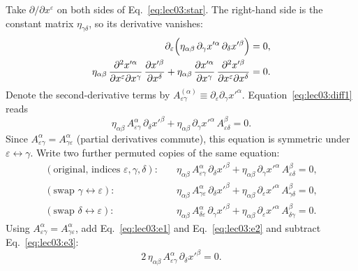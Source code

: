 Take $\partial/\partial x^\varepsilon$ on both sides of
Eq.~\eqref{eq:lec03:star}.  The right-hand side is the constant matrix
$\eta_{\gamma\delta}$, so its derivative vanishes:
\begin{align}
  \partial_\varepsilon \Bigl(
    \eta_{\alpha\beta}\,\partial_\gamma x'^\alpha\,\partial_\delta x'^\beta
  \Bigr) &= 0, \notag\\
  \eta_{\alpha\beta}\,
    \frac{\partial^2 x'^\alpha}{\partial x^\varepsilon \partial x^\gamma}\,
    \frac{\partial x'^\beta}{\partial x^\delta}
  +
  \eta_{\alpha\beta}\,
    \frac{\partial x'^\alpha}{\partial x^\gamma}\,
    \frac{\partial^2 x'^\beta}{\partial x^\varepsilon \partial x^\delta}
  &= 0.
  \label{eq:lec03:diff1}
\end{align}
Denote the second-derivative terms by
$A_{\varepsilon\gamma}^{(\alpha)} \equiv \partial_\varepsilon\partial_\gamma x'^\alpha$.
Equation~\eqref{eq:lec03:diff1} reads
\begin{equation}
  \eta_{\alpha\beta}\,A^\alpha_{\varepsilon\gamma}\,\partial_\delta x'^\beta
  + \eta_{\alpha\beta}\,\partial_\gamma x'^\alpha\,A^\beta_{\varepsilon\delta}
  = 0.
  \label{eq:lec03:diff1_short}
\end{equation}
Since $A^\alpha_{\varepsilon\gamma} = A^\alpha_{\gamma\varepsilon}$ (partial
derivatives commute), this equation is symmetric under
$\varepsilon\leftrightarrow\gamma$.  Write two further permuted copies
of the same equation:
\begin{align}
  (\text{original, indices }\varepsilon,\gamma,\delta):\quad &
  \eta_{\alpha\beta}\,A^\alpha_{\varepsilon\gamma}\,\partial_\delta x'^\beta
  + \eta_{\alpha\beta}\,\partial_\gamma x'^\alpha\,A^\beta_{\varepsilon\delta}
  = 0, \label{eq:lec03:e1}\\
  (\text{swap }\gamma\leftrightarrow\varepsilon):\quad &
  \eta_{\alpha\beta}\,A^\alpha_{\gamma\varepsilon}\,\partial_\delta x'^\beta
  + \eta_{\alpha\beta}\,\partial_\varepsilon x'^\alpha\,A^\beta_{\gamma\delta}
  = 0, \label{eq:lec03:e2}\\
  (\text{swap }\delta\leftrightarrow\varepsilon):\quad &
  \eta_{\alpha\beta}\,A^\alpha_{\delta\varepsilon}\,\partial_\gamma x'^\beta
  + \eta_{\alpha\beta}\,\partial_\varepsilon x'^\alpha\,A^\beta_{\delta\gamma}
  = 0. \label{eq:lec03:e3}
\end{align}
Using $A^\alpha_{\varepsilon\gamma} = A^\alpha_{\gamma\varepsilon}$, add
Eq.~\eqref{eq:lec03:e1} and Eq.~\eqref{eq:lec03:e2} and subtract
Eq.~\eqref{eq:lec03:e3}:
\begin{equation}
  2\,\eta_{\alpha\beta}\,A^\alpha_{\varepsilon\gamma}\,
  \partial_\delta x'^\beta = 0.
  \label{eq:lec03:diff_result}
\end{equation}
